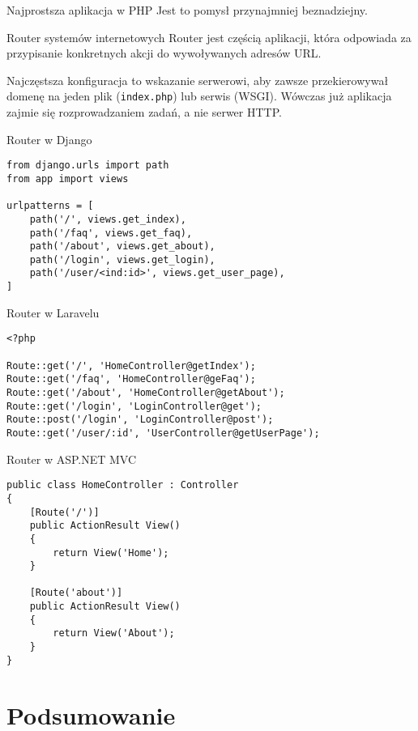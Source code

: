 \begin{frame}{Najprostsza aplikacja w PHP}
	Jest to pomysł przynajmniej beznadziejny.
\end{frame}

\begin{frame}{Router systemów internetowych}
	Router jest częścią aplikacji, która odpowiada za przypisanie konkretnych akcji do wywoływanych adresów URL.
	
	Najczęstsza konfiguracja to wskazanie serwerowi, aby zawsze przekierowywał domenę na jeden plik (\texttt{index.php}) lub serwis (WSGI). Wówczas już aplikacja zajmie się rozprowadzaniem zadań, a nie serwer HTTP.
\end{frame}

\begin{frame}[fragile]{Router w Django}
	\begin{lstlisting}
from django.urls import path
from app import views

urlpatterns = [
    path('/', views.get_index),
    path('/faq', views.get_faq),
    path('/about', views.get_about),
    path('/login', views.get_login),
    path('/user/<ind:id>', views.get_user_page),
]
	\end{lstlisting}
\end{frame}

\begin{frame}[fragile]{Router w Laravelu}
	\begin{lstlisting}
<?php

Route::get('/', 'HomeController@getIndex');
Route::get('/faq', 'HomeController@geFaq');
Route::get('/about', 'HomeController@getAbout');
Route::get('/login', 'LoginController@get');
Route::post('/login', 'LoginController@post');
Route::get('/user/:id', 'UserController@getUserPage');
	\end{lstlisting}
\end{frame}

\begin{frame}[fragile]{Router w ASP.NET MVC}
	\begin{lstlisting}
public class HomeController : Controller
{
	[Route('/')]
	public ActionResult View()
	{
		return View('Home');
	}
	
	[Route('about')]
	public ActionResult View()
	{
		return View('About');
	}
}
	\end{lstlisting}
\end{frame}

\section{Podsumowanie}

